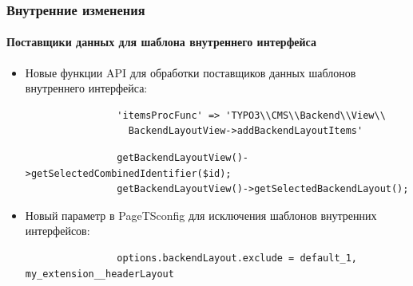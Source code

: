 \begin{frame}[fragile]
	\frametitle{Внутренние изменения}
	\framesubtitle{Поставщики данных для шаблона внутреннего интерфейса}

	\begin{itemize}
		\item Новые функции API для обработки поставщиков данных шаблонов внутреннего интерфейса:

			\begin{lstlisting}
				'itemsProcFunc' => 'TYPO3\\CMS\\Backend\\View\\
				  BackendLayoutView->addBackendLayoutItems'
			\end{lstlisting}

			\begin{lstlisting}
				getBackendLayoutView()->getSelectedCombinedIdentifier($id);
				getBackendLayoutView()->getSelectedBackendLayout();
			\end{lstlisting}

		\item Новый параметр в PageTSconfig для исключения шаблонов внутренних интерфейсов:

			\begin{lstlisting}
				options.backendLayout.exclude = default_1, my_extension__headerLayout
			\end{lstlisting}

	\end{itemize}

\end{frame}


